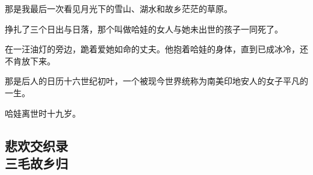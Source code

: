 \par 那是我最后一次看见月光下的雪山、湖水和故乡茫茫的草原。
\par 挣扎了三个日出与日落，那个叫做哈娃的女人与她未出世的孩子一同死了。
\par 在一汪油灯的旁边，跪着爱她如命的丈夫。他抱着哈娃的身体，直到已成冰冷，还不肯放下来。
\par 那是后人的日历十六世纪初叶，一个被现今世界统称为南美印地安人的女子平凡的一生。
\par 哈娃离世时十九岁。















\subsection{悲欢交织录\\\small{三毛故乡归}}

